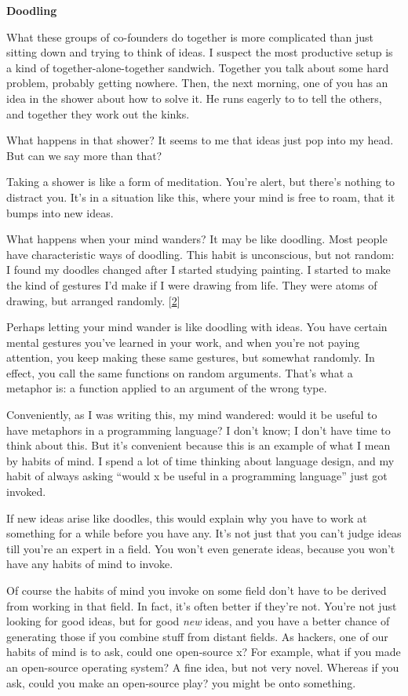 \textbf{Doodling}

What these groups of co-founders do together is more complicated than
just sitting down and trying to think of ideas. I suspect the most
productive setup is a kind of together-alone-together sandwich. Together
you talk about some hard problem, probably getting nowhere. Then, the
next morning, one of you has an idea in the shower about how to solve
it. He runs eagerly to to tell the others, and together they work out
the kinks.

What happens in that shower? It seems to me that ideas just pop into my
head. But can we say more than that?

Taking a shower is like a form of meditation. You're alert, but there's
nothing to distract you. It's in a situation like this, where your mind
is free to roam, that it bumps into new ideas.

What happens when your mind wanders? It may be like doodling. Most
people have characteristic ways of doodling. This habit is unconscious,
but not random: I found my doodles changed after I started studying
painting. I started to make the kind of gestures I'd make if I were
drawing from life. They were atoms of drawing, but arranged randomly.
{[}\hyperref[f2n]{2}{]}

Perhaps letting your mind wander is like doodling with ideas. You have
certain mental gestures you've learned in your work, and when you're not
paying attention, you keep making these same gestures, but somewhat
randomly. In effect, you call the same functions on random arguments.
That's what a metaphor is: a function applied to an argument of the
wrong type.

Conveniently, as I was writing this, my mind wandered: would it be
useful to have metaphors in a programming language? I don't know; I
don't have time to think about this. But it's convenient because this is
an example of what I mean by habits of mind. I spend a lot of time
thinking about language design, and my habit of always asking ``would x
be useful in a programming language'' just got invoked.

If new ideas arise like doodles, this would explain why you have to work
at something for a while before you have any. It's not just that you
can't judge ideas till you're an expert in a field. You won't even
generate ideas, because you won't have any habits of mind to invoke.

Of course the habits of mind you invoke on some field don't have to be
derived from working in that field. In fact, it's often better if
they're not. You're not just looking for good ideas, but for good
\emph{new} ideas, and you have a better chance of generating those if
you combine stuff from distant fields. As hackers, one of our habits of
mind is to ask, could one open-source x? For example, what if you made
an open-source operating system? A fine idea, but not very novel.
Whereas if you ask, could you make an open-source play? you might be
onto something.

